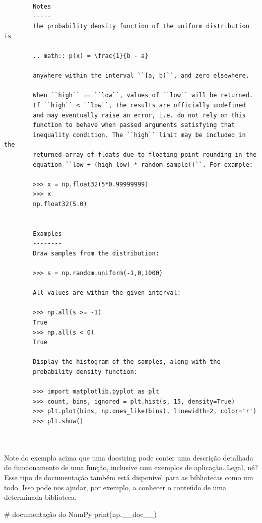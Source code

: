 \documentclass[
  brazilian,
  letterpaper,
  DIV=11,
  numbers=noendperiod]{scrreprt}
\newenvironment{Shaded}{\begin{snugshade}}{\end{snugshade}}
\newcommand{\BuiltInTok}[1]{\textcolor[rgb]{0.00,0.23,0.31}{#1}}
\newcommand{\CommentTok}[1]{\textcolor[rgb]{0.37,0.37,0.37}{#1}}
\newcommand{\NormalTok}[1]{\textcolor[rgb]{0.00,0.23,0.31}{#1}}
\begin{document}
\begin{verbatim}
        Notes
        -----
        The probability density function of the uniform distribution is

        .. math:: p(x) = \frac{1}{b - a}

        anywhere within the interval ``[a, b)``, and zero elsewhere.

        When ``high`` == ``low``, values of ``low`` will be returned.
        If ``high`` < ``low``, the results are officially undefined
        and may eventually raise an error, i.e. do not rely on this
        function to behave when passed arguments satisfying that
        inequality condition. The ``high`` limit may be included in the
        returned array of floats due to floating-point rounding in the
        equation ``low + (high-low) * random_sample()``. For example:

        >>> x = np.float32(5*0.99999999)
        >>> x
        np.float32(5.0)


        Examples
        --------
        Draw samples from the distribution:

        >>> s = np.random.uniform(-1,0,1000)

        All values are within the given interval:

        >>> np.all(s >= -1)
        True
        >>> np.all(s < 0)
        True

        Display the histogram of the samples, along with the
        probability density function:

        >>> import matplotlib.pyplot as plt
        >>> count, bins, ignored = plt.hist(s, 15, density=True)
        >>> plt.plot(bins, np.ones_like(bins), linewidth=2, color='r')
        >>> plt.show()

        
\end{verbatim}

Note do exemplo acima que uma docstring pode conter uma descrição
detalhada do funcionamento de uma função, inclusive com exemplos de
aplicação. Legal, né? Esse tipo de documentação também está disponível
para as bibliotecas como um todo. Isso pode nos ajudar, por exemplo, a
conhecer o conteúdo de uma determinada biblioteca.

\begin{Shaded}
\begin{Highlighting}[]
\CommentTok{\# documentação do NumPy}
\BuiltInTok{print}\NormalTok{(np.\_\_doc\_\_)}
\end{Highlighting}
\end{Shaded}
\end{document}
